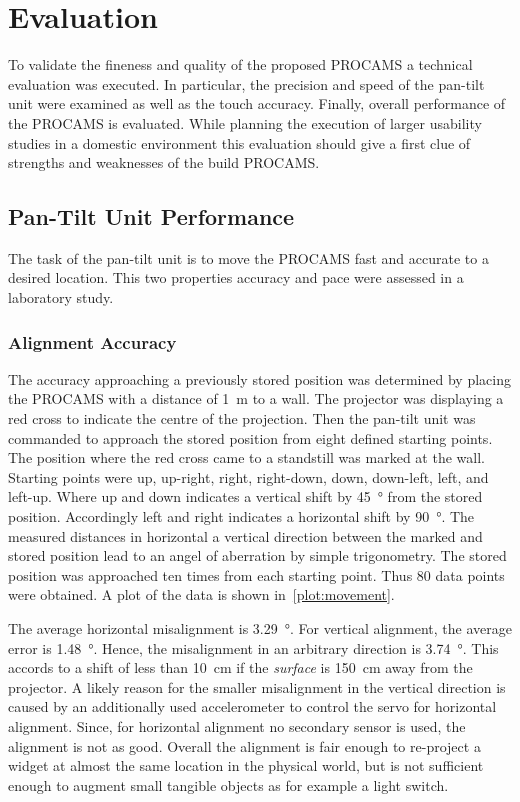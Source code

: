 \chapter{Evaluation}\label{chapter:evaluation}
To validate the fineness and quality of the proposed PROCAMS a technical evaluation was executed. In particular, the precision and speed of the pan-tilt unit were examined as well as the touch accuracy. Finally, overall performance of the PROCAMS is evaluated.
While planning the execution of larger usability studies in a domestic environment this evaluation should give a first clue of strengths and weaknesses of the build PROCAMS. 

\section{Pan-Tilt Unit Performance}
The task of the pan-tilt unit is to move the PROCAMS fast and accurate to a desired location. This two properties accuracy and pace were assessed in a laboratory study.

\subsection{Alignment Accuracy}
The accuracy approaching a previously stored position was determined by placing the PROCAMS with a distance of \SI{1}{\m} to a wall. The projector was displaying a red cross to indicate the centre of the projection. Then the pan-tilt unit was commanded to approach the stored position from eight defined starting points. The position where the red cross came to a standstill was marked at the wall.
Starting points were up, up-right, right, right-down, down, down-left, left, and left-up. Where up and down indicates a vertical shift by \SI{45}{\degree} from the stored position. Accordingly left and right indicates a horizontal shift by \SI{90}{\degree}. The measured distances in horizontal a vertical direction between the marked and stored position lead to an angel of aberration by simple trigonometry.
The stored position was approached ten times from each starting point. Thus 80 data points were obtained. A plot of the data is shown in~\autoref{plot:movement}.


The average horizontal misalignment is \SI{3,29}{\degree}. For vertical alignment, the average error is \SI{1,48}{\degree}. Hence, the misalignment in an arbitrary direction is \SI{3,74}{\degree}. This accords to a shift of less than \SI{10}{\cm} if the \emph{surface} is \SI{150}{\cm} away from the projector.
A likely reason for the smaller misalignment in the vertical direction is caused by an additionally used accelerometer to control the servo for horizontal alignment. Since, for horizontal alignment no secondary sensor is used, the alignment is not as good. Overall the alignment is fair enough to re-project a widget at almost the same location in the physical world, but is not sufficient enough to augment small tangible objects as for example a light switch. 

